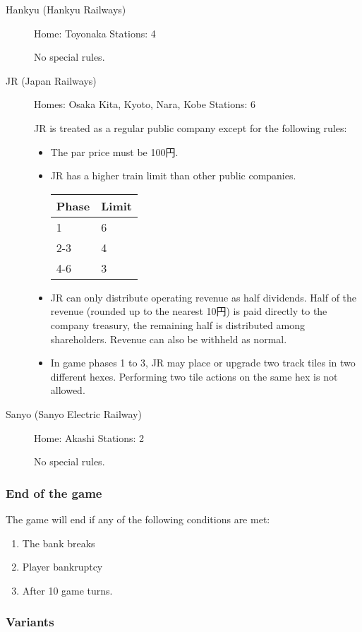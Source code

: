\begin{multicols}{2}
\begin{description}
\item[Hankyu (Hankyu Railways)] \hfill
Home: Toyonaka \hfill Stations: 4

  No special rules.

\item[JR (Japan Railways)] \hfill \label{JR}
Homes: Osaka Kita, Kyoto, Nara, Kobe \hfill Stations: 6

JR is treated as a regular public company except for the following rules:
\begin{itemize}
\item The par price must be 100円.
\item JR has a higher train limit than other public companies.

\begin{tabular}{ll}
  Phase & Limit \\
  \hline
  1 &  6 \\
  2-3 & 4 \\
  4-6 & 3
\end{tabular}
\item JR can only distribute operating revenue as half dividends. Half
  of the revenue (rounded up to the nearest 10円) is paid directly
  to the company treasury, the remaining half is distributed among
  shareholders. Revenue can also be withheld as normal.
\item In game phases 1 to 3, JR may place or upgrade two track tiles in
  two different hexes. Performing two tile actions on the same hex is
  not allowed.
\end{itemize}

\item[Sanyo (Sanyo Electric Railway)] Home: Akashi Stations: 2

No special rules.
\end{description}
\subsubsection{End of the game}

The game will end if any of the following conditions are met:
\begin{enumerate}
\item The bank breaks

\item Player bankruptcy

\item After 10 game turns.
\end{enumerate}

\subsubsection{Variants}


\end{multicols}
